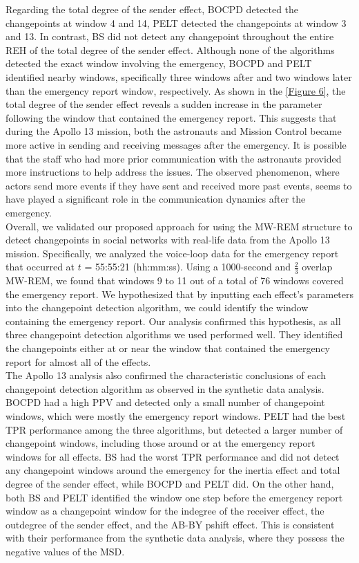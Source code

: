 \documentclass[]{interact}
\theoremstyle{plain}%
\theoremstyle{definition}
\theoremstyle{remark}
\begin{document}
{	Regarding the total degree of the sender effect, BOCPD detected the changepoints at window 4 and 14, PELT detected the changepoints at window 3 and 13. In contrast, BS did not detect any changepoint throughout the entire REH of the total degree of the sender effect. Although none of the algorithms detected the exact window involving the emergency, BOCPD and PELT identified nearby windows, specifically three windows after and two windows later than the emergency report window, respectively. As shown in the \autoref{Figure 6}, the total degree of the sender effect reveals a sudden increase in the parameter following the window that contained the emergency report. This suggests that during the Apollo 13 mission, both the astronauts and Mission Control became more active in sending and receiving messages after the emergency. It is possible that the staff who had more prior communication with the astronauts provided more instructions to help address the issues. The observed phenomenon, where actors send more events if they have sent and received more past events, seems to have played a significant role in the communication dynamics after the emergency.\\
	
	Overall, we validated our proposed approach for using the MW-REM structure to detect changepoints in social networks with real-life data from the Apollo 13 mission. Specifically, we analyzed the voice-loop data for the emergency report that occurred at $t$ = 55:55:21 (hh:mm:ss). Using a 1000-second and $\frac{2}{3}$ overlap MW-REM, we found that windows 9 to 11 out of a total of 76 windows covered the emergency report. We hypothesized that by inputting each effect's parameters into the changepoint detection algorithm, we could identify the window containing the emergency report. Our analysis confirmed this hypothesis, as all three changepoint detection algorithms we used performed well. They identified the changepoints either at or near the window that contained the emergency report for almost all of the effects. \\ 
	
	The Apollo 13 analysis also confirmed the characteristic conclusions of each changepoint detection algorithm as observed in the synthetic data analysis. BOCPD had a high PPV and detected only a small number of changepoint windows, which were mostly the emergency report windows. PELT had the best TPR performance among the three algorithms, but detected a larger number of changepoint windows, including those around or at the emergency report windows for all effects. BS had the worst TPR performance and did not detect any changepoint windows around the emergency for the inertia effect and total degree of the sender effect, while BOCPD and PELT did. On the other hand, both BS and PELT identified the window one step before the emergency report window as a changepoint window for the indegree of the receiver effect, the outdegree of the sender effect, and the AB-BY pshift effect. This is consistent with their performance from the synthetic data analysis, where they possess the negative values of the MSD.
	
}
\end{document}
